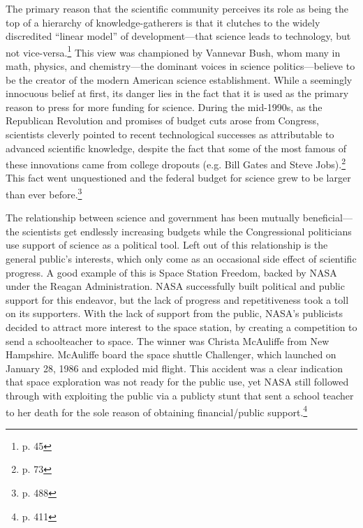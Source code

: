 \documentclass{article}[12pt]
\begin{document}
The primary reason that the scientific community perceives its role as being
the top of a hierarchy of knowledge-gatherers is that it clutches to the widely
discredited ``linear model'' of development---that science leads to technology,
but not vice-versa.\footnote{p. 45} This view was championed by Vannevar Bush,
whom many in math, physics, and chemistry---the dominant voices in science
politics---believe to be the creator of the modern American science
establishment. While a seemingly innocuous belief at first, its danger lies in
the fact that it is used as the primary reason to press for more funding for
science. During the mid-1990s, as the Republican Revolution and promises of
budget cuts arose from Congress, scientists cleverly pointed to recent
technological successes as attributable to advanced scientific knowledge,
despite the fact that some of the most famous of these innovations came from
college dropouts (e.g. Bill Gates and Steve Jobs).\footnote{p. 73} This fact went
unquestioned and the federal budget for science grew to be larger than ever
before.\footnote{p. 488}

The relationship between science and government has been mutually
beneficial---the scientists get endlessly increasing budgets while the
Congressional politicians use support of science as a political tool. Left out
of this relationship is the general public's interests, which only come as an
occasional side effect of scientific progress. A good example of this is
Space Station Freedom, backed by NASA under the Reagan Administration.  NASA
successfully built political and public support for this endeavor, but the
lack of progress and repetitiveness took a toll on its supporters.  With the
lack of support from the public, NASA's publicists decided to attract more
interest to the space station, by creating a competition to send a
schoolteacher to space.  The winner was Christa McAuliffe from New Hampshire.
McAuliffe board the space shuttle Challenger, which launched on January 28,
1986 and exploded mid flight.  This accident was a clear indication that space
exploration was not ready for the public use, yet NASA still followed through
with exploiting the public via a publicty stunt that sent a school teacher to her death
for the sole reason of obtaining financial/public support.\footnote{p. 411}
\end{document}
